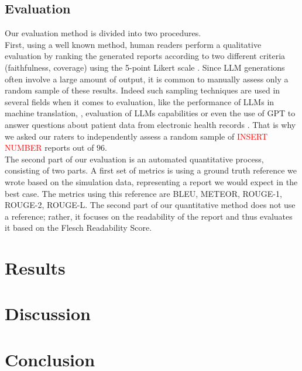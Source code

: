 \documentclass[preprint,12pt]{elsarticle}
\begin{document}
\subsection{Evaluation}
\label{subsec4}


Our evaluation method is divided into two procedures. \\

First, using a well known method, human readers perform a qualitative evaluation by ranking the generated reports according to two different criteria (faithfulness, coverage) using the 5-point Likert scale \cite{Fischer2022}. Since LLM generations often involve a large amount of output, it is common to manually assess only a random sample of these results. Indeed such sampling techniques are used in several fields when it comes to evaluation, like the performance of LLMs in machine translation, \cite{Hendy2023}, evaluation of LLMs capabilities \cite{openai2024} or even the use of GPT to answer questions about patient data from electronic health records \cite{Vatsal2024}. That is why we asked our raters to independently assess a random sample of \textcolor{red}{INSERT NUMBER} reports out of $96$.  \\


The second part of our evaluation is an automated quantitative process, consisting of two parts. A first set of metrics is using a ground truth reference we wrote based on the simulation data, representing a report we would expect in the best case. The metrics using this reference are BLEU, METEOR, ROUGE-1, ROUGE-2, ROUGE-L. The second part of our quantitative method does not use a reference; rather, it focuses on the readability of the report and thus evaluates it based on the Flesch Readability Score.






\section{Results}
\label{sec4}


\section{Discussion}
\label{sec5}

\section{Conclusion}
\label{sec6}
\end{document}
